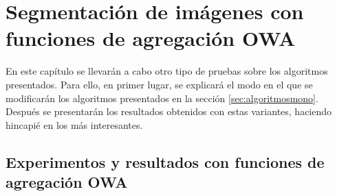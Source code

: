 \chapter{Segmentación de imágenes con funciones de agregación OWA}

En este capítulo se llevarán a cabo otro tipo de pruebas sobre los algoritmos presentados. Para ello, en primer lugar, se explicará el modo en el que se modificarán los algoritmos presentados en la sección \ref{sec:algoritmosmono}. Después se presentarán los resultados obtenidos con estas variantes, haciendo hincapié en los más interesantes.

%

\section{Experimentos y resultados con funciones de agregación OWA}
